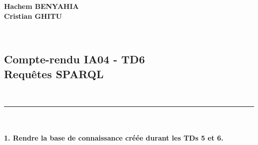 \documentclass[11pt]{report}
\begin{document}
\noindent
\textbf{Hachem BENYAHIA}
~\\
\textbf{Cristian GHITU}

~\\
\begin{center}
\section*{Compte-rendu IA04 - TD6 ~\\ Requêtes SPARQL}

~\\
\rule{\textwidth}{1pt}
\end{center}

~\\\\
\textbf{1. Rendre la base de connaissance créée durant les TDs 5 et 6.}
\end{document}
